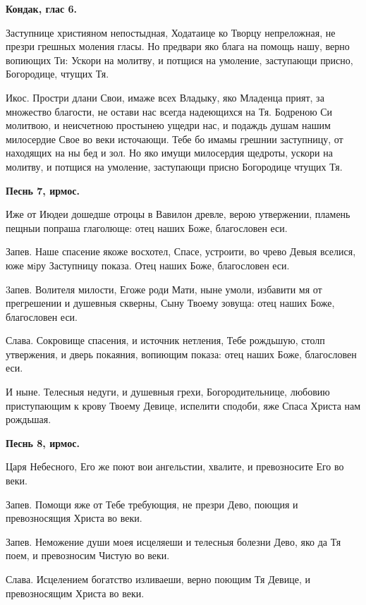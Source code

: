 \medskip


\bfseries Кондак, глас 6.\normalfont{}


Заступнице християном непостыдная, Ходатаице ко Творцу непреложная, не презри грешных моления гласы. Но предвари яко блага на помощь нашу, верно вопиющих Ти: Ускори на молитву, и потщися на умоление, заступающи присно, Богородице, чтущих Тя.

Икос. Простри длани Свои, имаже всех Владыку, яко Младенца прият, за множество благости, не остави нас всегда надеющихся на Тя. Бодреною Си молитвою, и неисчетною простынею ущедри нас, и подаждь душам нашим милосердие Свое во веки источающи. Тебе бо имамы грешнии заступницу, от находящих на ны бед и зол. Но яко имущи милосердия щедроты, ускори на молитву, и потщися на умоление, заступающи присно Богородице чтущих Тя.


\medskip


\bfseries Песнь 7, ирмос.\normalfont{}


Иже от Июдеи дошедше отроцы в Вавилон древле, верою утвержении, пламень пещныи попраша глаголюще: отец наших Боже,   благословен еси.

Запев. Наше спасение якоже восхотел, Спасе, устроити, во чрево Девыя вселися, юже мiру Заступницу показа. Отец наших Боже, благословен еси.

3апев. Волителя милости, Егоже роди Мати, ныне умоли, избавити мя от прегрешении и душевныя скверны, Сыну Твоему зовуща: отец наших Боже, благословен еси.

Слава. Сокровище спасения, и источник нетления, Тебе рождьшую, столп утвержения, и дверь покаяния, вопиющим показа: отец наших Боже, благословен еси.

И ныне. Телесныя недуги, и душевныя грехи, Богородительнице, любовию приступающим к крову Твоему Девице, испелити сподоби, яже Спаса Христа нам рождьшая.


\medskip


\bfseries Песнь 8, ирмос.\normalfont{}


Царя Небесного, Его же поют вои ангельстии, хвалите, и превозносите Его во веки.

Запев. Помощи яже от Тебе требующия, не презри Дево, поющия и превозносящия Христа во веки.

Запев. Неможение души моея исцеляеши и телесныя болезни Дево, яко да Тя поем, и превозносим Чистую во веки.

Слава. Исцелением богатство изливаеши, верно поющим Тя Девице, и превозносящим Христа во веки.

